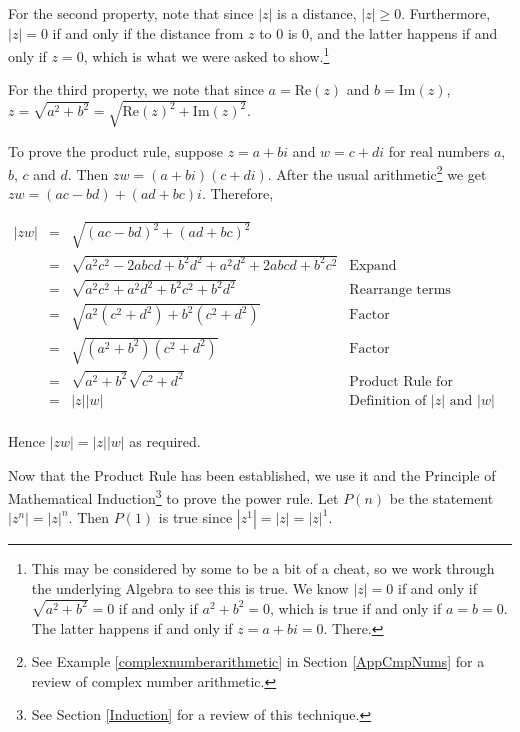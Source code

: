\documentclass{ximera}
\begin{document}
 

For the second property, note that since $|z|$ is a distance, $|z| \geq 0$.  Furthermore,  $|z| = 0$ if and only if the distance from $z$ to $0$ is $0$, and the latter happens if and only if $z = 0$, which is what we were asked to show.\footnote{This may be considered by some to be a bit of a cheat, so we work through the underlying Algebra to see this is true.  We know  $|z| = 0$ if and only if $\sqrt{a^2+b^2} = 0$ if and only if $a^2+b^2 = 0$, which is true if and only if $a = b = 0$.  The latter happens if and only if $z = a + bi =0$.  There.}  

 

For the third property, we note that since $a = \text{Re}(z)$ and $b = \text{Im}(z)$, $z = \sqrt{a^2+b^2} = \sqrt{\text{Re}(z)^2 + \text{Im}(z)^2}$.

 

To prove the product rule, suppose $z = a + bi$ and  $w = c + di$ for real numbers $a$, $b$, $c$ and $d$.  Then $zw = (a+bi)(c+di)$.  After the usual arithmetic\footnote{See Example \ref{complexnumberarithmetic} in Section \ref{AppCmpNums} for a review of complex number arithmetic.} we get $zw = (ac-bd) + (ad+bc)i$. Therefore,

\[ \begin{array}{rcll}
|zw| & = & \sqrt{(ac-bd)^2+(ad+bc)^2} & \\
		 & = & \sqrt{a^2c^2 - 2abcd + b^2d^2 + a^2d^2 +2abcd + b^2c^2} & \text{Expand} \\
		 & = & \sqrt{a^2c^2 + a^2d^2 + b^2c^2 + b^2d^2} & \text{Rearrange terms} \\
		 & = & \sqrt{a^2\left(c^2+d^2\right) + b^2\left(c^2+d^2\right)} & \text{Factor} \\
		 & = & \sqrt{\left(a^2+b^2\right)\left(c^2+d^2\right)} & \text{Factor}\\
		 & = & \sqrt{a^2+b^2} \sqrt{c^2+d^2} & \text{Product Rule for Radicals} \\
		 & = & |z| |w| & \text{Definition of $|z|$ and $|w|$} \\ \end{array} \]
		 
Hence $|zw| = |z| |w|$ as required.  

 

Now that the Product Rule has been established, we use it and the Principle of Mathematical Induction\footnote{See Section \ref{Induction} for a review of this technique.} to 	prove the power rule.  Let $P(n)$ be the statement $\left|z^{n}\right| = |z|^n$.  Then $P(1)$ is true since $\left|z^{1}\right| = |z| = |z|^1$. 
  
\end{document}
